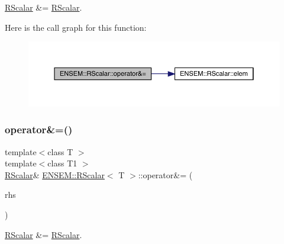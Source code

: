 \mbox{\hyperlink{classENSEM_1_1RScalar}{R\+Scalar}} \&= \mbox{\hyperlink{classENSEM_1_1RScalar}{R\+Scalar}}. 

Here is the call graph for this function\+:
\nopagebreak
\begin{figure}[H]
\begin{center}
\leavevmode
\includegraphics[width=350pt]{d0/d8c/classENSEM_1_1RScalar_aa091ededdea0fc13deb359321f213780_cgraph}
\end{center}
\end{figure}
\mbox{\label{classENSEM_1_1RScalar_aa091ededdea0fc13deb359321f213780}} 
\subsubsection{\texorpdfstring{operator\&=()}{operator\&=()}\hspace{0.1cm}{\footnotesize\ttfamily [3/3]}}
{\footnotesize\ttfamily template$<$class T $>$ \\
template$<$class T1 $>$ \\
\mbox{\hyperlink{classENSEM_1_1RScalar}{R\+Scalar}}\& \mbox{\hyperlink{classENSEM_1_1RScalar}{E\+N\+S\+E\+M\+::\+R\+Scalar}}$<$ T $>$\+::operator\&= (\begin{DoxyParamCaption}\item[{const \mbox{\hyperlink{classENSEM_1_1RScalar}{R\+Scalar}}$<$ T1 $>$ \&}]{rhs }\end{DoxyParamCaption})\hspace{0.3cm}{\ttfamily [inline]}}



\mbox{\hyperlink{classENSEM_1_1RScalar}{R\+Scalar}} \&= \mbox{\hyperlink{classENSEM_1_1RScalar}{R\+Scalar}}. 

